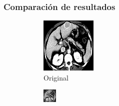 \documentclass[11pt]{beamer}
\begin{document}
\begin{frame}
\frametitle{Comparación de resultados}

\begin{figure}[H]
    \centering
    \begin{subfigure}[h]{0.3\textwidth} 
        \includegraphics[width=\textwidth]{img/tomo.png}
        \caption{Original}
        \label{fig:original1}
    \end{subfigure}%
    \hfill
    \begin{subfigure}[h]{0.30\textwidth}
        \includegraphics[width=\textwidth]{img/tomo_granu_4.png}

\end{subfigure}
\end{figure}
\end{frame}
\end{document}
